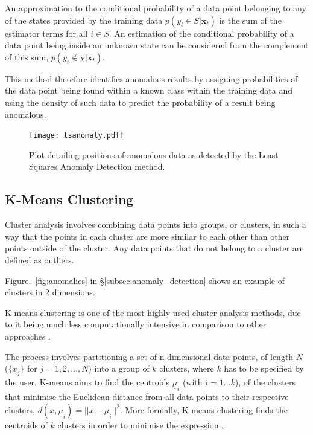 An approximation to the conditional probability of a data point belonging to any of the states provided by the training data $p(y_t \in S|\mathbf{x}_t)$ is the sum of the estimator terms for all $i \in S$. An estimation of the conditional probability of a data point being inside an unknown state can be considered from the complement of this sum, $p(y_t \notin \chi|\mathbf{x}_t)$.

This method therefore identifies anomalous results by assigning probabilities of the data point being found within a known class within the training data and using the density of such data to predict the probability of a result being anomalous. 

\begin{figure}[t]
    \texttt{[image: lsanomaly.pdf]}
    \caption[Least Squares Anomaly Score]{Plot detailing positions of anomalous data as detected by the Least Squares Anomaly Detection method.}
    \label{fig:lsanomaly}
\end{figure}

\subsection{K-Means Clustering}
\label{subsec:kmeans}

Cluster analysis involves combining data points into groups, or clusters, in such a way that the points in each cluster are more similar to each other than other points outside of the cluster. Any data points that do not belong to a cluster are defined as outliers. 

Figure.~\ref{fig:anomalies} in \S \ref{subsec:anomaly_detection} shows an example of clusters in 2 dimensions. 

K-means clustering is one of the most highly used cluster analysis methods, due to it being much less computationally intensive in comparison to other approaches \cite{Kanungo:2002:EKC:628329.628801}.

The process involves partitioning a set of n-dimensional data points, of length $N$ ($\{\underline{x}_j\}$ for $j=1,2,...,N$) into a group of $k$ clusters, where $k$ has to be specified by the user. K-means aims to find the centroids $\underline{\mu}_i$ (with $i=1...k$), of the clusters that minimise the Euclidean distance from all data points to their respective clusters, $d(\underline{x}, \underline{\mu}_i) = ||\underline{x}-\underline{\mu}_i||^2$. More formally, K-means clustering finds the centroids of $k$ clusters in order to minimise the expression \cite{596afe3f2b5a4ff3b8f4f9793ad2f4ee},

